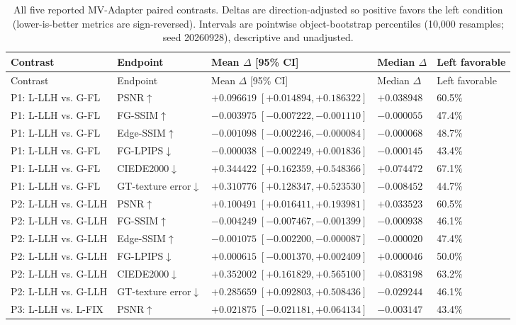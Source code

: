 \documentclass[11pt]{article}
\begin{document}
\endgroup
\begingroup\scriptsize
\begin{longtable}{p{2.7cm}p{2.3cm}p{5.4cm}p{2.2cm}p{1.7cm}}
\caption{All five reported MV-Adapter paired contrasts. Deltas are direction-adjusted so positive favors the left condition (lower-is-better metrics are sign-reversed). Intervals are pointwise object-bootstrap percentiles (10,000 resamples; seed 20260928), descriptive and unadjusted.}\label{tab:mvadapter-layerwise-pairs}\\
\toprule Contrast & Endpoint & Mean $\Delta$ [95\% CI] & Median $\Delta$ & Left favorable \\
\midrule\endfirsthead
\toprule Contrast & Endpoint & Mean $\Delta$ [95\% CI] & Median $\Delta$ & Left favorable \\
\midrule\endhead
P1: L-LLH vs. G-FL & PSNR$\uparrow$ & $+0.096619\;[+0.014894,+0.186322]$ & $+0.038948$ & 60.5\% \\
P1: L-LLH vs. G-FL & FG-SSIM$\uparrow$ & $-0.003975\;[-0.007222,-0.001110]$ & $-0.000055$ & 47.4\% \\
P1: L-LLH vs. G-FL & Edge-SSIM$\uparrow$ & $-0.001098\;[-0.002246,-0.000084]$ & $-0.000068$ & 48.7\% \\
P1: L-LLH vs. G-FL & FG-LPIPS$\downarrow$ & $-0.000038\;[-0.002249,+0.001836]$ & $-0.000145$ & 43.4\% \\
P1: L-LLH vs. G-FL & CIEDE2000$\downarrow$ & $+0.344422\;[+0.162359,+0.548366]$ & $+0.074472$ & 67.1\% \\
P1: L-LLH vs. G-FL & GT-texture error$\downarrow$ & $+0.310776\;[+0.128347,+0.523530]$ & $-0.008452$ & 44.7\% \\
P2: L-LLH vs. G-LLH & PSNR$\uparrow$ & $+0.100491\;[+0.016411,+0.193981]$ & $+0.033523$ & 60.5\% \\
P2: L-LLH vs. G-LLH & FG-SSIM$\uparrow$ & $-0.004249\;[-0.007467,-0.001399]$ & $-0.000938$ & 46.1\% \\
P2: L-LLH vs. G-LLH & Edge-SSIM$\uparrow$ & $-0.001075\;[-0.002200,-0.000087]$ & $-0.000020$ & 47.4\% \\
P2: L-LLH vs. G-LLH & FG-LPIPS$\downarrow$ & $+0.000615\;[-0.001370,+0.002409]$ & $+0.000046$ & 50.0\% \\
P2: L-LLH vs. G-LLH & CIEDE2000$\downarrow$ & $+0.352002\;[+0.161829,+0.565100]$ & $+0.083198$ & 63.2\% \\
P2: L-LLH vs. G-LLH & GT-texture error$\downarrow$ & $+0.285659\;[+0.092803,+0.508436]$ & $-0.029244$ & 46.1\% \\
P3: L-LLH vs. L-FIX & PSNR$\uparrow$ & $+0.021875\;[-0.021181,+0.064134]$ & $-0.003147$ & 43.4\% \\

\end{longtable}
\end{document}
